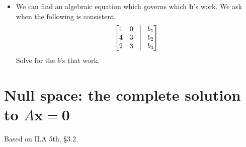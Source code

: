 \documentclass[11pt,oneside]{amsbook}
\theoremstyle{definition}
\theoremstyle{plain}
\theoremstyle{definition}
\theoremstyle{remark}
\numberwithin{equation}{section}
\numberwithin{figure}{section}
\begin{document}
\begin{itemize}
  \[A=\begin{bmatrix}1&0\\4&3\\2&3\end{bmatrix}
  \]
  The column space of $A$ consists of the plane spanned by the its two column vectors. We can test whether the vector $(-1,-1,1)$ lies in the column space of $A$ by deciding whether the system is consistent:
  \[A\mathbf{x}=\begin{bmatrix}-1\\-1\\1\end{bmatrix}
  \]
  Draw a sketchy picture showing the concept.
\item We can find an algebraic equation which governs which $\mathbf{b}$'s work. We ask when the following is consistent.
  \[\begin{bmatrix}
      1&0&\vline&b_1\\
      4&3&\vline&b_2\\
      2&3&\vline&b_3
    \end{bmatrix}
  \]
  Solve for the $b$'s that work.
\end{itemize}

\newpage
\section{Null space: the complete solution to $A\mathbf{x}=\mathbf{0}$}

Based on ILA 5th, \S 3.2.
\end{document}
